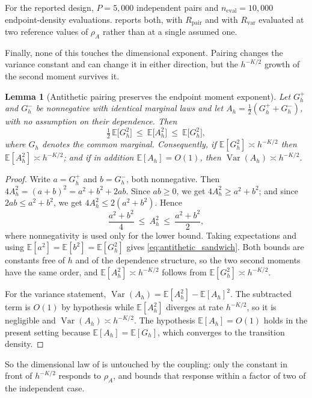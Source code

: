 \documentclass[11pt]{article}
\newtheorem{lemma}[lemma]{Lemma}
\theoremstyle{definition}
\newcommand{\E}{\mathbb{E}}
\newcommand{\Var}{\operatorname{Var}}
\newcommand{\neval}{n_{\mathrm{eval}}}
\begin{document}
For the reported design, $P=5{,}000$ independent pairs and $\neval=10{,}000$ endpoint-density evaluations.  reports both, with $R_{\mathrm{pair}}$ and with $R_{\mathrm{var}}$ evaluated at two reference values of $\rho_A$ rather than at a single assumed one.

Finally, none of this touches the dimensional exponent. Pairing changes the variance constant and can change it in either direction, but the $h^{-K/2}$ growth of the second moment survives it.

\begin{lemma}[Antithetic pairing preserves the endpoint moment exponent]\label{lem:antithetic_exponent}
Let $G_h^{+}$ and $G_h^{-}$ be nonnegative with identical marginal laws and let $A_h=\tfrac12(G_h^{+}+G_h^{-})$, with no assumption on their dependence. Then
\begin{equation}\label{eq:antithetic_sandwich}
\tfrac12\,\E\bigl[G_h^2\bigr]\ \le\ \E\bigl[A_h^2\bigr]\ \le\ \E\bigl[G_h^2\bigr],
\end{equation}
where $G_h$ denotes the common marginal. Consequently, if $\E[G_h^2]\asymp h^{-K/2}$ then $\E[A_h^2]\asymp h^{-K/2}$; and if in addition $\E[A_h]=O(1)$, then $\Var(A_h)\asymp h^{-K/2}$.
\end{lemma}

\begin{proof}
Write $a=G_h^{+}$ and $b=G_h^{-}$, both nonnegative. Then $4A_h^2=(a+b)^2=a^2+b^2+2ab$. Since $ab\ge0$, we get $4A_h^2\ge a^2+b^2$; and since $2ab\le a^2+b^2$, we get $4A_h^2\le2(a^2+b^2)$. Hence
\[
\frac{a^2+b^2}{4}\ \le\ A_h^2\ \le\ \frac{a^2+b^2}{2},
\]
where nonnegativity is used only for the lower bound. Taking expectations and using $\E[a^2]=\E[b^2]=\E[G_h^2]$ gives \eqref{eq:antithetic_sandwich}. Both bounds are constants free of $h$ and of the dependence structure, so the two second moments have the same order, and $\E[A_h^2]\asymp h^{-K/2}$ follows from $\E[G_h^2]\asymp h^{-K/2}$.

For the variance statement, $\Var(A_h)=\E[A_h^2]-\E[A_h]^2$. The subtracted term is $O(1)$ by hypothesis while $\E[A_h^2]$ diverges at rate $h^{-K/2}$, so it is negligible and $\Var(A_h)\asymp h^{-K/2}$. The hypothesis $\E[A_h]=O(1)$ holds in the present setting because $\E[A_h]=\E[G_h]$, which converges to the transition density.
\end{proof}

So the dimensional law of  is untouched by the coupling: only the constant in front of $h^{-K/2}$ responds to $\rho_A$, and  bounds that response within a factor of two of the independent case.
\end{document}
